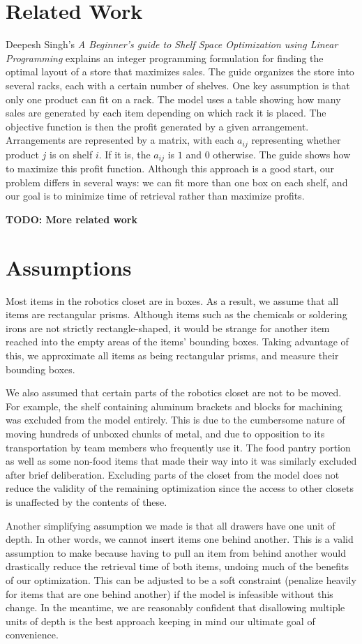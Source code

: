 \documentclass[10pt]{article}
\theoremstyle{named}
\begin{document}
\section{Related Work}
Deepesh Singh's \emph{A Beginner’s guide to Shelf Space Optimization using Linear Programming}
\cite{india} explains an integer programming formulation for finding the optimal layout
of a store that maximizes sales. The guide organizes the store into several racks, each
with a certain number of shelves. One key assumption is that only one product can fit
on a rack. The model uses a table showing how many sales are generated by each item
depending on which rack it is placed. The objective function is then the profit
generated by a given arrangement. Arrangements are represented by a matrix, with
each $a_{ij}$ representing whether product $j$ is on shelf $i$. If it is, the
$a_{ij}$ is $1$ and $0$ otherwise. The guide shows how to maximize this profit function.
Although this approach is a good start, our problem differs in several ways: we can
fit more than one box on each shelf, and our goal is to minimize time of retrieval
rather than maximize profits.

\textbf{\color{red} TODO: More related work}

\section{Assumptions}
Most items in the robotics closet are in boxes. As a result, we assume that all
items are rectangular prisms. Although items such as the chemicals or soldering irons
are not strictly rectangle-shaped, it would be strange for another item reached into
the empty areas of the items' bounding boxes. Taking advantage of this, we approximate
all items as being rectangular prisms, and measure their bounding boxes.
\par
We also assumed that certain parts of the robotics closet are not to be moved. For example, the shelf containing aluminum brackets and blocks for machining was excluded from the model entirely. This is due to the cumbersome nature of moving hundreds of unboxed chunks of metal, and due to opposition to its transportation by team members who frequently use it. The food pantry portion as well as some non-food items that made their way into it was similarly excluded after brief deliberation. Excluding parts of the closet from the model does not reduce the validity of the remaining optimization since the access to other closets is unaffected by the contents of these.
\par
Another simplifying assumption we made is that all drawers have one unit of depth. In other words, we cannot insert items one behind another. This is a valid assumption to make because having to pull an item from behind another would drastically reduce the retrieval time of both items, undoing much of the benefits of our optimization. This can be adjusted to be a soft constraint (penalize heavily for items that are one behind another) if the model is infeasible without this change. In the meantime, we are reasonably confident that disallowing multiple units of depth is the best approach keeping in mind our ultimate goal of convenience.
\end{document}
